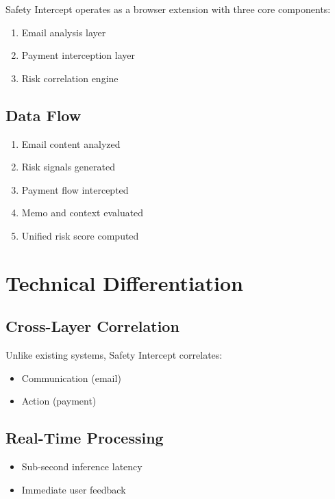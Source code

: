 \documentclass[11pt]{article}
\begin{document}
Safety Intercept operates as a browser extension with three core components:

\begin{enumerate}
    \item Email analysis layer
    \item Payment interception layer
    \item Risk correlation engine
\end{enumerate}

\subsection{Data Flow}

\begin{enumerate}
    \item Email content analyzed
    \item Risk signals generated
    \item Payment flow intercepted
    \item Memo and context evaluated
    \item Unified risk score computed
\end{enumerate}

\section{Technical Differentiation}

\subsection{Cross-Layer Correlation}

Unlike existing systems, Safety Intercept correlates:
\begin{itemize}
    \item Communication (email)
    \item Action (payment)
\end{itemize}

\subsection{Real-Time Processing}

\begin{itemize}
    \item Sub-second inference latency
    \item Immediate user feedback
\end{itemize}
\end{document}
